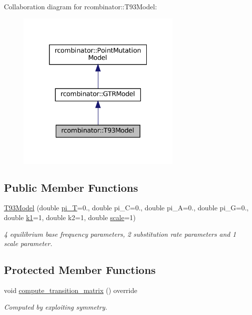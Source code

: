 Collaboration diagram for rcombinator\+:\+:T93\+Model\+:\nopagebreak
\begin{figure}[H]
\begin{center}
\leavevmode
\includegraphics[width=229pt]{classrcombinator_1_1T93Model__coll__graph}
\end{center}
\end{figure}
\subsection*{Public Member Functions}
\begin{DoxyCompactItemize}
\item 
\mbox{\hyperlink{classrcombinator_1_1T93Model_ad857daf369e1d16fc8233b08dc0deef8}{T93\+Model}} (double \mbox{\hyperlink{classrcombinator_1_1GTRModel_a1f58fe556a5ce9aaba6168c9f91e8372}{pi\+\_\+T}}=0., double pi\+\_\+C=0., double pi\+\_\+A=0., double pi\+\_\+G=0., double \mbox{\hyperlink{classrcombinator_1_1T93Model_a98c3187ba2e9da1f608f17b1e3cf341b}{k1}}=1, double k2=1, double \mbox{\hyperlink{classrcombinator_1_1PointMutationModel_a328a30a438bb1b6a625faa3f714a85c8}{scale}}=1)
\begin{DoxyCompactList}\small\item\em 4 equilibrium base frequency parameters, 2 substitution rate parameters and 1 scale parameter. \end{DoxyCompactList}\end{DoxyCompactItemize}
\subsection*{Protected Member Functions}
\begin{DoxyCompactItemize}
\item 
\mbox{\label{classrcombinator_1_1T93Model_aaa8c96927a1ff3b8c611f0d0f9d6f36a}} 
void \mbox{\hyperlink{classrcombinator_1_1T93Model_aaa8c96927a1ff3b8c611f0d0f9d6f36a}{compute\+\_\+transition\+\_\+matrix}} () override
\begin{DoxyCompactList}\small\item\em Computed by exploiting symmetry. \end{DoxyCompactList}\end{DoxyCompactItemize}
